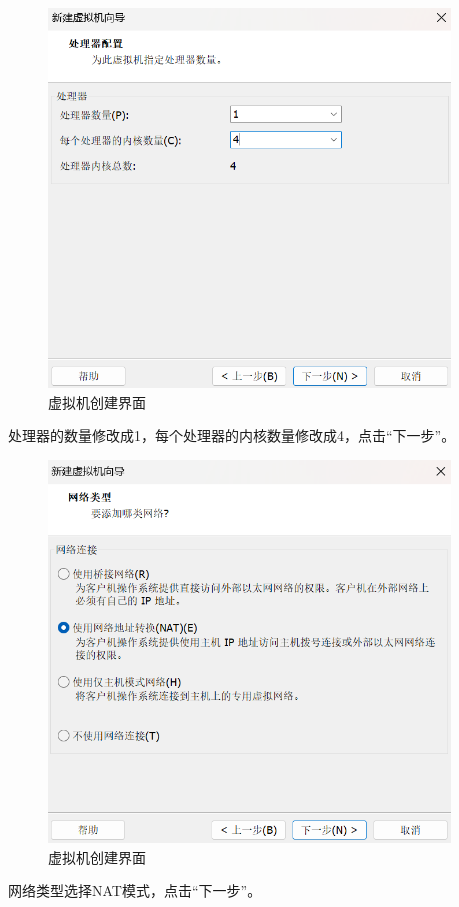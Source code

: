 \documentclass[UTF8]{ctexart}
\begin{document}
\begin{figure}[H]
    \centering
    \includegraphics[width=0.95\textwidth]{picture/Screenshot 2024-10-14 113043.png}
    \caption{虚拟机创建界面}
\end{figure}
处理器的数量修改成1，每个处理器的内核数量修改成4，点击“下一步”。

\begin{figure}[H]
    \centering
    \includegraphics[width=0.95\textwidth]{picture/Screenshot 2024-10-14 113215.png}
    \caption{虚拟机创建界面}
\end{figure}
网络类型选择NAT模式，点击“下一步”。
\end{document}
